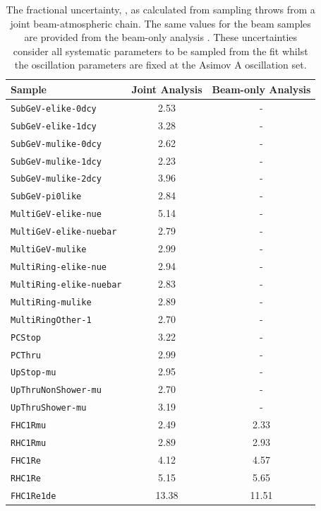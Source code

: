 \begin{table}[ht!]
    \centering
    \begin{tabular}{|l|c|c|}
      \hline
      Sample & Joint Analysis & Beam-only Analysis \\
      \hline
      \texttt{SubGeV-elike-0dcy} & 2.53 & - \\
      \texttt{SubGeV-elike-1dcy} & 3.28 & - \\
      \texttt{SubGeV-mulike-0dcy} & 2.62 & - \\
      \texttt{SubGeV-mulike-1dcy} & 2.23 & - \\
      \texttt{SubGeV-mulike-2dcy} & 3.96 & - \\
      \texttt{SubGeV-pi0like} & 2.84 & - \\
      \texttt{MultiGeV-elike-nue} & 5.14 & - \\
      \texttt{MultiGeV-elike-nuebar} & 2.79 & - \\
      \texttt{MultiGeV-mulike} & 2.99 & - \\
      \texttt{MultiRing-elike-nue} & 2.94 & - \\
      \texttt{MultiRing-elike-nuebar} & 2.83 & - \\
      \texttt{MultiRing-mulike} & 2.89 & - \\
      \texttt{MultiRingOther-1} & 2.70 & - \\
      \texttt{PCStop} & 3.22 & - \\
      \texttt{PCThru} & 2.99 & - \\
      \texttt{UpStop-mu} & 2.95 & - \\
      \texttt{UpThruNonShower-mu} & 2.70 & - \\
      \texttt{UpThruShower-mu} & 3.19 & - \\
      \texttt{FHC1Rmu} & 2.49 & 2.33 \\
      \texttt{RHC1Rmu} & 2.89 & 2.93 \\
      \texttt{FHC1Re} & 4.12 & 4.57 \\
      \texttt{RHC1Re} & 5.15 & 5.65 \\
      \texttt{FHC1Re1de} & 13.38 & 11.51 \\
      \hline
      \hline
    \end{tabular}
    \caption{The fractional uncertainty, , as calculated from sampling  throws from a joint beam-atmospheric chain. The same values for the beam samples are provided from the beam-only analysis \cite{Dunne2020-uf, t2k_tn_393}. These uncertainties consider all systematic parameters to be sampled from the fit whilst the oscillation parameters are fixed at the Asimov A oscillation set.}
    \label{tab:OscillationAnalysis_PosteriorPredEventRateUncertainty}
\end{table}

